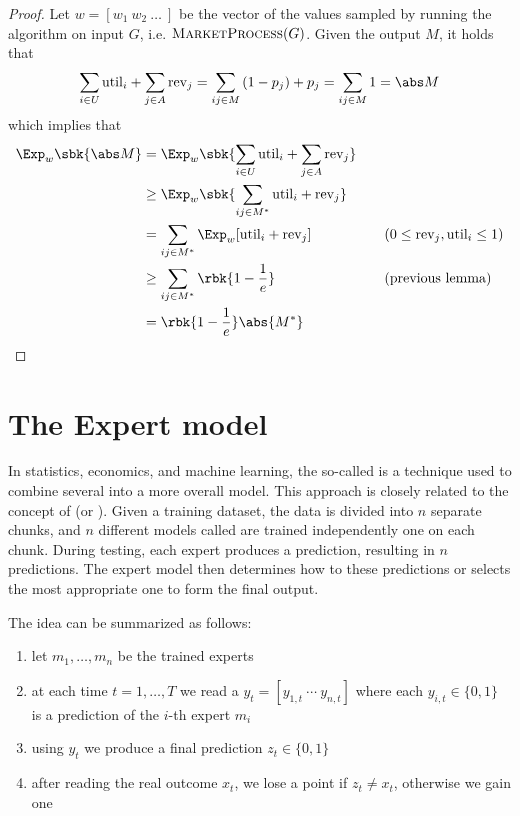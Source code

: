 \documentclass[a4paper, 12pt]{report}
\begin{document}
    \begin{proof}
        Let $w = [w_1 \ w_2 \ \ldots \ ]$ be the vector of the values sampled by running the algorithm on input $G$, i.e. $\textsc{MarketProcess}(G)$. Given the output $M$, it holds that $$\sum_{i \in U}{\mbox{util}_i} + \sum_{j \in A}{\mbox{rev}_j} = \sum_{ij \in M}{(1 - p_j) + p_j } = \sum_{ij \in M}{1} = \abs M$$ which implies that
        \begin{equation*}
            \begin{alignedat}{2}
                \Exp_w \sbk{\abs M} &= \Exp_w \sbk{\sum_{i \in U}{\mbox{util}_i} + \sum_{j \in A}{\mbox{rev}_j}} && \\
                                    &\ge \Exp_w \sbk{\sum_{ij \in M^*}{\mbox{util}_i + \mbox{rev}_j}} && \\
                                    &= \sum_{ij \in M^*}{\Exp_w[\mbox{util}_i + \mbox{rev}_j]} && \quad \quad (0 \le \mbox{rev}_j, \mbox{util}_i \le 1) \\
                                    &\ge \sum_{ij \in M^*}{\rbk{1 - \dfrac{1}{e}}} && \quad \quad (\mbox{previous lemma}) \\
                                    &= \rbk{1 - \dfrac{1}{e}} \abs {M^*} && \\
            \end{alignedat}
        \end{equation*}
    \end{proof}

    \section{The Expert model}

    In statistics, economics, and machine learning, the so-called  is a technique used to combine several  into a more  overall model. This approach is closely related to the concept of  (or ). Given a training dataset, the data is divided into $n$ separate chunks, and $n$ different models called  are trained independently one on each chunk. During testing, each expert produces a prediction, resulting in $n$ predictions. The expert model then determines how to  these predictions or selects the most appropriate one to form the final output.

    The idea can be summarized as follows:

    \begin{enumerate}
        \item let $m_1, \ldots, m_n$ be the trained experts
        \item at each time $t = 1, \ldots, T$ we read a  $y_t = [y_{1, t} \ \cdots \ y_{n, t}]$ where each $y_{i, t} \in \{0, 1\}$ is a prediction of the $i$-th expert $m_i$
        \item using $y_t$ we produce a final prediction $z_t \in \{0, 1\}$
        \item after reading the real outcome $x_t$, we lose a point if $z_t \neq x_t$, otherwise we gain one
    \end{enumerate}
\end{document}
